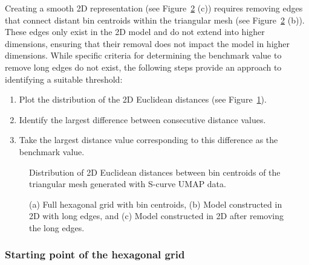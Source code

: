 \documentclass[
  12pt]{article}
\providecommand{\tightlist}{%
  \setlength{\itemsep}{0pt}\setlength{\parskip}{0pt}}\usepackage{longtable,booktabs,array}
\begin{document}
Creating a smooth 2D representation (see Figure~\ref{fig-modelScurve}
(c)) requires removing edges that connect distant bin centroids within
the triangular mesh (see Figure~\ref{fig-modelScurve} (b)). These edges
only exist in the 2D model and do not extend into higher dimensions,
ensuring that their removal does not impact the model in higher
dimensions. While specific criteria for determining the benchmark value
to remove long edges do not exist, the following steps provide an
approach to identifying a suitable threshold:

\begin{enumerate}
\def\labelenumi{\arabic{enumi}.}
\tightlist
\item
  Plot the distribution of the 2D Euclidean distances (see
  Figure~\ref{fig-distScurve}).
\item
  Identify the largest difference between consecutive distance values.
\item
  Take the largest distance value corresponding to this difference as
  the benchmark value.
\end{enumerate}

\begin{figure}[H]


\caption{\label{fig-distScurve}Distribution of 2D Euclidean distances
between bin centroids of the triangular mesh generated with S-curve UMAP
data.}

\end{figure}%

\begin{figure}[H]


\caption{\label{fig-modelScurve}(a) Full hexagonal grid with bin
centroids, (b) Model constructed in 2D with long edges, and (c) Model
constructed in 2D after removing the long edges.}

\end{figure}%

\subsubsection{Starting point of the hexagonal
grid}\label{starting-point-of-the-hexagonal-grid}
\end{document}
